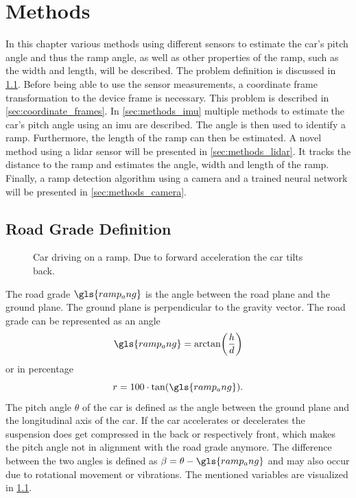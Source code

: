 \chapter{Methods}
\label{ch:Methods}
In this chapter various methods using different sensors to estimate the car's pitch angle and thus the ramp angle, as well as other properties of the ramp, such as the width and length, will be described.
The problem definition is discussed in \cref{sec:road_grade_definition}.
Before being able to use the sensor measurements, a coordinate frame transformation to the device frame is necessary.
This problem is described in \cref{sec:coordinate_frames}.
In \cref{sec:methods_imu} multiple methods to estimate the car's pitch angle using an \gls{imu} are described.
The angle is then used to identify a ramp.
Furthermore, the length of the ramp can then be estimated.
A novel method using a \gls{lidar} sensor will be presented in \cref{sec:methods_lidar}.
It tracks the distance to the ramp and estimates the angle, width and length of the ramp.
Finally, a ramp detection algorithm using a camera and a trained neural network will be presented in \cref{sec:methods_camera}.


\section{Road Grade Definition}
\label{sec:road_grade_definition}
\begin{figure}[htb]
	\centering
	
	\caption[Ramp angle definition]{Car driving on a ramp. Due to forward acceleration the car tilts back.}
	\label{fig:tikz_car_tilt}
\end{figure}
The road grade $\gls{ramp_ang}$ is the angle between the road plane and the ground plane.
The ground plane is perpendicular to the gravity vector.
The road grade can be represented as an angle
\begin{equation}
	\gls{ramp_ang} = \arctan(\frac{h}{d})
\end{equation}
or in percentage
\begin{equation}
	r = 100\cdot\tan(\gls{ramp_ang}).
\end{equation}
The pitch angle $\theta$ of the car is defined as the angle between the ground plane and the longitudinal axis of the car.
If the car accelerates or decelerates the suspension does get compressed in the back or respectively front, which makes the pitch angle not in alignment with the road grade anymore.
The difference between the two angles is defined as $\beta = \theta- \gls{ramp_ang}$ and may also occur due to rotational movement or vibrations.
The mentioned variables are visualized in \cref{fig:tikz_car_tilt}.



